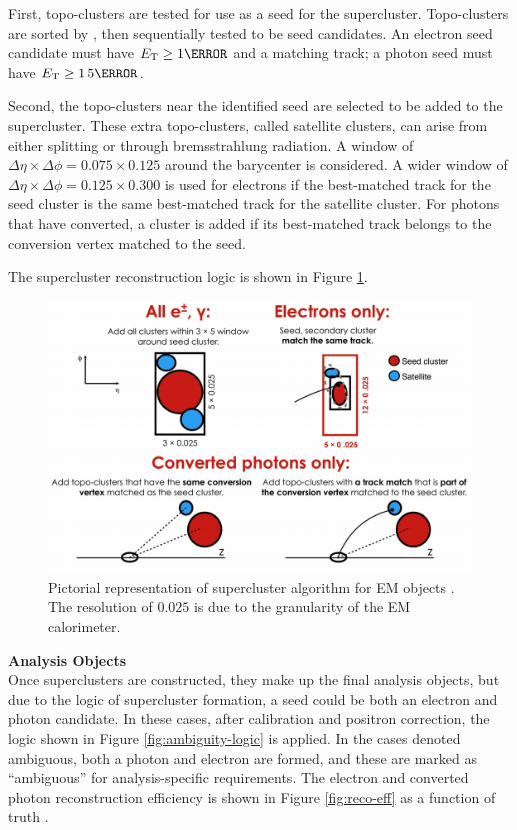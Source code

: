 First, topo-clusters are tested for use as a seed for the supercluster. Topo-clusters are sorted by \et, then sequentially tested to be seed candidates. An electron seed candidate must have $\et \geq \unit{1}{\GeV}$ and a matching track; a photon seed must have $\et \geq \unit{1.5}{\GeV}$. 

Second, the topo-clusters near the identified seed are selected to be added to the supercluster. These extra topo-clusters, called satellite clusters, can arise from either splitting or through bremsstrahlung radiation. A window of $\Delta \eta \times \Delta \phi = 0.075 \times 0.125$ around the barycenter is considered. A wider window of $\Delta \eta \times \Delta \phi = 0.125 \times 0.300$ is used for electrons if the best-matched track for the seed cluster is the same best-matched track for the satellite cluster. For photons that have converted, a cluster is added if its best-matched track belongs to the conversion vertex matched to the seed.

The supercluster reconstruction logic is shown in Figure \ref{fig:supercluster-reco}.

\begin{figure}[h]
    \centering
    \includegraphics[width=.90\textwidth]{chapters/chapter3_eventreco/images/supercluster-formation.png}
    \caption[Pictorial representation of supercluster algorithm for \gls{EM} objects]{Pictorial representation of supercluster algorithm for \gls{EM} objects \cite{photon-electron-perf}. The resolution of $0.025$ is due to the granularity of the \gls{EM} calorimeter.}
    \label{fig:supercluster-reco}
\end{figure}

\noindent\textbf{Analysis Objects}\\ 
\indent Once superclusters are constructed, they make up the final analysis objects, but due to the logic of supercluster formation, a seed could be both an electron and photon candidate. In these cases, after calibration and positron correction, the logic shown in Figure \ref{fig:ambiguity-logic} is applied. In the cases denoted ambiguous, both a photon and electron are formed, and these are marked as ``ambiguous'' for analysis-specific requirements. The electron and converted photon reconstruction efficiency is shown in Figure \ref{fig:reco-eff} as a function of truth \et.


